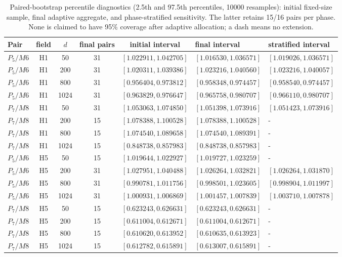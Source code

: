 \begin{table}[htbp]
\centering\scriptsize
\setlength{\tabcolsep}{3pt}
\caption{Paired-bootstrap percentile diagnostics (2.5th and 97.5th percentiles, 10000 resamples): initial fixed-size sample, final adaptive aggregate, and phase-stratified sensitivity. The latter retains 15/16 pairs per phase. None is claimed to have 95\% coverage after adaptive allocation; a dash means no extension.}\label{tab:ext-bootstrap}
\begin{tabular}{lccccll}\toprule
Pair & field & $d$ & final pairs & initial interval & final interval & stratified interval\\\midrule
$P_{5}/M6$ & H1 & 50 & 31 & $[1.022911,1.042705]$ & $[1.016530,1.036571]$ & $[1.019026,1.036571]$\\
$P_{5}/M6$ & H1 & 200 & 31 & $[1.020311,1.039386]$ & $[1.023216,1.040560]$ & $[1.023216,1.040057]$\\
$P_{5}/M6$ & H1 & 800 & 31 & $[0.956404,0.973812]$ & $[0.958348,0.974457]$ & $[0.958540,0.974457]$\\
$P_{5}/M6$ & H1 & 1024 & 31 & $[0.963829,0.976647]$ & $[0.965758,0.980707]$ & $[0.966110,0.980707]$\\
$P_{7}/M8$ & H1 & 50 & 31 & $[1.053063,1.074850]$ & $[1.051398,1.073916]$ & $[1.051423,1.073916]$\\
$P_{7}/M8$ & H1 & 200 & 15 & $[1.078388,1.100528]$ & $[1.078388,1.100528]$ & -\\
$P_{7}/M8$ & H1 & 800 & 15 & $[1.074540,1.089658]$ & $[1.074540,1.089391]$ & -\\
$P_{7}/M8$ & H1 & 1024 & 15 & $[0.848738,0.857983]$ & $[0.848738,0.857983]$ & -\\
$P_{5}/M6$ & H5 & 50 & 15 & $[1.019644,1.022927]$ & $[1.019727,1.023259]$ & -\\
$P_{5}/M6$ & H5 & 200 & 31 & $[1.027951,1.040488]$ & $[1.026264,1.032821]$ & $[1.026264,1.031870]$\\
$P_{5}/M6$ & H5 & 800 & 31 & $[0.990781,1.011756]$ & $[0.998501,1.023605]$ & $[0.998904,1.011997]$\\
$P_{5}/M6$ & H5 & 1024 & 31 & $[1.000931,1.006869]$ & $[1.001457,1.007839]$ & $[1.003710,1.007878]$\\
$P_{7}/M8$ & H5 & 50 & 15 & $[0.623243,0.626631]$ & $[0.623243,0.626631]$ & -\\
$P_{7}/M8$ & H5 & 200 & 15 & $[0.611004,0.612671]$ & $[0.611004,0.612671]$ & -\\
$P_{7}/M8$ & H5 & 800 & 15 & $[0.610620,0.613952]$ & $[0.610635,0.613923]$ & -\\
$P_{7}/M8$ & H5 & 1024 & 15 & $[0.612782,0.615891]$ & $[0.613007,0.615891]$ & -\\
\bottomrule\end{tabular}
\end{table}
\FloatBarrier
